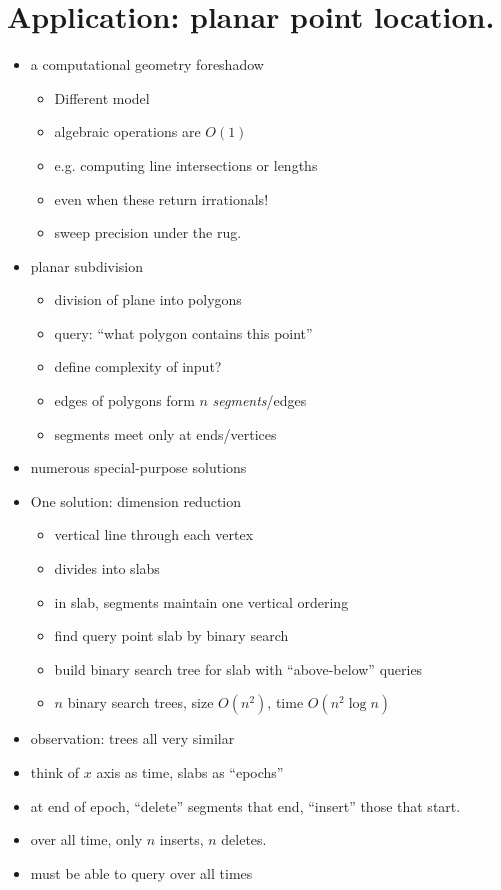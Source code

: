 \documentclass{article}
\begin{document}
\section{Application: planar point location.}
\begin{itemize}
\item a computational geometry foreshadow
\begin{itemize}
\item Different model
\item algebraic operations are $O(1)$
\item e.g. computing line intersections or lengths
\item even when these return irrationals!
\item sweep precision under the rug.
\end{itemize}
\item planar subdivision
\begin{itemize}
\item division of plane into polygons
\item query: ``what polygon contains this point''
\item define complexity of input?
\item edges of polygons form $n$ \emph{segments}/edges
\item segments meet only at ends/vertices
\end{itemize}
\item numerous special-purpose solutions
\item One solution: dimension reduction
\begin{itemize}
\item vertical line through each vertex
\item divides into slabs
\item in slab, segments maintain one vertical ordering
\item find query point slab by binary search
\item build binary search tree for slab with ``above-below'' queries
\item $n$ binary search trees, size $O(n^2)$, time $O(n^2\log n)$
\end{itemize}
\item observation: trees all very similar
\item think of $x$ axis as time, slabs as ``epochs''
\item at end of epoch, ``delete'' segments that end, ``insert'' those
  that start.
\item over all time, only $n$ inserts, $n$ deletes.
\item must be able to query over all times
\end{itemize}
\end{document}
